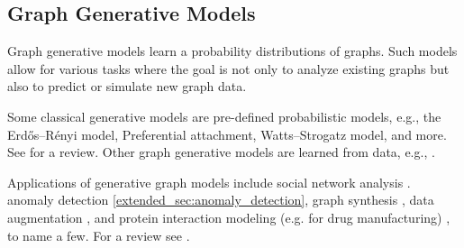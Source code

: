 \documentclass[letterpaper]{article} %
\newcommand{\ron}[1]{{{\textcolor{red}{\textbf{[Ron:} {#1}\textbf{]}}}}}
\begin{document}
\subsection{Graph Generative Models}
Graph generative models learn a probability distributions of graphs. %
 Such models allow for various tasks %
  where the goal is not only to analyze existing graphs but also to predict or simulate new graph data.

Some classical generative models are pre-defined probabilistic models, e.g., the Erdős–Rényi model, Preferential attachment, Watts–Strogatz model, and more. See \cite{newman2003classical_graph_generative}  for a review. Other graph generative models are learned from data, e.g., \cite{lee2019review, kipf2016variational,you2018graphrnn,bojchevski2018netgan}. %


Applications of generative graph models include social network analysis \cite{wang2018graphgan,grover2019graphite,harshvardhan2020comprehensive}.  anomaly detection \ref{extended_sec:anomaly_detection}, graph synthesis \cite{you2018graphrnn, guo2022systematic}, data augmentation \cite{ding2019data_augmentation}, and protein interaction modeling (e.g. for drug manufacturing) \cite{de2018molgan,ingraham2019generative}, to name a few.  For a review see \cite{ma2021comprehensive}.   
\end{document}
